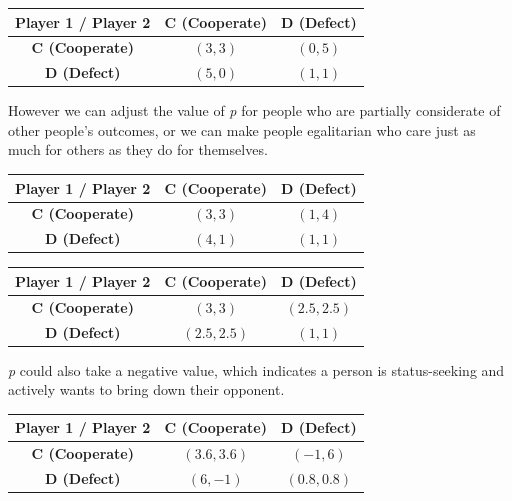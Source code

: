 \documentclass[11pt,preprint]{elsarticle}
\let\origtable\table
\let\endorigtable\endtable
\renewenvironment{table}[1][2] {
    \expandafter\origtable\expandafter[H]
} {
    \endorigtable
}
\numberwithin{equation}{section}
\numberwithin{figure}{section}
\numberwithin{table}{section}
\begin{document}
\begin{table}[ht]
\centering
\begin{tabular}{|c|c|c|}
\hline
\textbf{Player 1 / Player 2} & \textbf{C (Cooperate)} & \textbf{D (Defect)} \\
\hline
\textbf{C (Cooperate)} & $(3, 3)$ & $(0, 5)$ \\
\hline
\textbf{D (Defect)} & $(5, 0)$ & $(1, 1)$ \\
\hline
\end{tabular}
\caption{Prisoner's Dilemma Payoff Matrix for $p = 0$ (Self-interested person)}
\end{table}

However we can adjust the value of \emph{p} for people who are partially
considerate of other people's outcomes, or we can make people
egalitarian who care just as much for others as they do for themselves.

\begin{table}[ht]
\centering
\begin{tabular}{|c|c|c|}
\hline
\textbf{Player 1 / Player 2} & \textbf{C (Cooperate)} & \textbf{D (Defect)} \\
\hline
\textbf{C (Cooperate)} & $(3, 3)$ & $(1, 4)$ \\
\hline
\textbf{D (Defect)} & $(4, 1)$ & $(1, 1)$ \\
\hline
\end{tabular}
\caption{Prisoner's Dilemma Payoff Matrix for $p = 0.2$ (Partially considers others' outcomes)}
\end{table}

\begin{table}[ht]
\centering
\begin{tabular}{|c|c|c|}
\hline
\textbf{Player 1 / Player 2} & \textbf{C (Cooperate)} & \textbf{D (Defect)} \\
\hline
\textbf{C (Cooperate)} & $(3, 3)$ & $(2.5, 2.5)$ \\
\hline
\textbf{D (Defect)} & $(2.5, 2.5)$ & $(1, 1)$ \\
\hline
\end{tabular}
\caption{Prisoner's Dilemma Payoff Matrix for $p = 0.5$ (Egalitarian person)}
\end{table}

\emph{p} could also take a negative value, which indicates a person is
status-seeking and actively wants to bring down their opponent.

\begin{table}[ht]
\centering
\begin{tabular}{|c|c|c|}
\hline
\textbf{Player 1 / Player 2} & \textbf{C (Cooperate)} & \textbf{D (Defect)} \\
\hline
\textbf{C (Cooperate)} & $(3.6, 3.6)$ & $(-1, 6)$ \\
\hline
\textbf{D (Defect)} & $(6, -1)$ & $(0.8, 0.8)$ \\
\hline
\end{tabular}
\caption{Prisoner's Dilemma Payoff Matrix for $p = -0.2$ (Negative influence by others' outcomes)}
\end{table}
\end{document}
